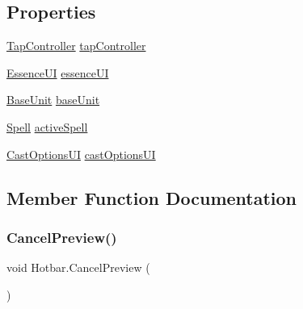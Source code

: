 \subsection*{Properties}
\begin{DoxyCompactItemize}
\item 
\mbox{\hyperlink{class_tap_controller}{Tap\+Controller}} \mbox{\hyperlink{class_hotbar_a0281562a5bf5e3224f4d88f090bf3a84}{tap\+Controller}}
\item 
\mbox{\hyperlink{class_essence_u_i}{Essence\+UI}} \mbox{\hyperlink{class_hotbar_a02baa28776d8464929571a32904d78a5}{essence\+UI}}
\item 
\mbox{\hyperlink{class_base_unit}{Base\+Unit}} \mbox{\hyperlink{class_hotbar_a4a0bb9b20e1c7c8df122470fd540768b}{base\+Unit}}
\item 
\mbox{\hyperlink{class_spell}{Spell}} \mbox{\hyperlink{class_hotbar_ab8c1abafc83f793590f0bf08981d50ef}{active\+Spell}}
\item 
\mbox{\hyperlink{class_cast_options_u_i}{Cast\+Options\+UI}} \mbox{\hyperlink{class_hotbar_a5712a8564c6cdbae01f3900648ce9fae}{cast\+Options\+UI}}
\end{DoxyCompactItemize}


\subsection{Member Function Documentation}
\mbox{\label{class_hotbar_a0c213365074f45fd1b1010eabe3f3d4d}} 
\subsubsection{\texorpdfstring{CancelPreview()}{CancelPreview()}}
{\footnotesize\ttfamily void Hotbar.\+Cancel\+Preview (\begin{DoxyParamCaption}{ }\end{DoxyParamCaption})}

